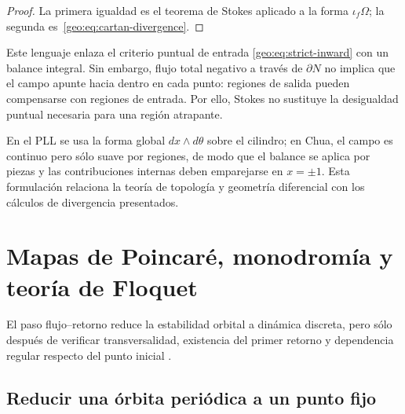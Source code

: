 \begin{proof}
La primera igualdad es el teorema de Stokes aplicado a la forma
\(\iota_f\Omega\); la segunda es~\eqref{geo:eq:cartan-divergence}.
\end{proof}

Este lenguaje enlaza el criterio puntual de entrada
\eqref{geo:eq:strict-inward} con un balance integral. Sin embargo, flujo total
negativo a través de \(\partial N\) no implica que el campo apunte hacia
dentro en cada punto: regiones de salida pueden compensarse con regiones de
entrada. Por ello, Stokes no sustituye la desigualdad puntual necesaria para
una región atrapante.

En el PLL se usa la forma global \(dx\wedge d\theta\) sobre el cilindro; en
Chua, el campo es continuo pero sólo suave por regiones, de modo que el balance
se aplica por piezas y las contribuciones internas deben emparejarse en
\(x=\pm1\). Esta formulación relaciona la teoría de topología y geometría
diferencial con los cálculos de divergencia presentados.

\fi
\HAFOGeoRenderBlocktrue
\ifdefined\HAFOGeoBlockSelect
  \HAFOGeoRenderBlockfalse
  \ifdefined\HAFOGeoBlockPoincare\HAFOGeoRenderBlocktrue\fi
\fi
\ifHAFOGeoRenderBlock
\HAFOStudyNeedspace
\section{Mapas de Poincaré, monodromía y teoría de Floquet}
\label{sec:geo-poincare-floquet}

\HAFOCardPoincare

El paso flujo--retorno reduce la estabilidad orbital a dinámica discreta, pero
sólo después de verificar transversalidad, existencia del primer retorno y
dependencia regular respecto del punto inicial
\cite{JaurezEtAl2021TGEDII,HirschSmaleDevaney2013,Kuznetsov2023Bifurcation}.

\subsection{Reducir una órbita periódica a un punto fijo}

